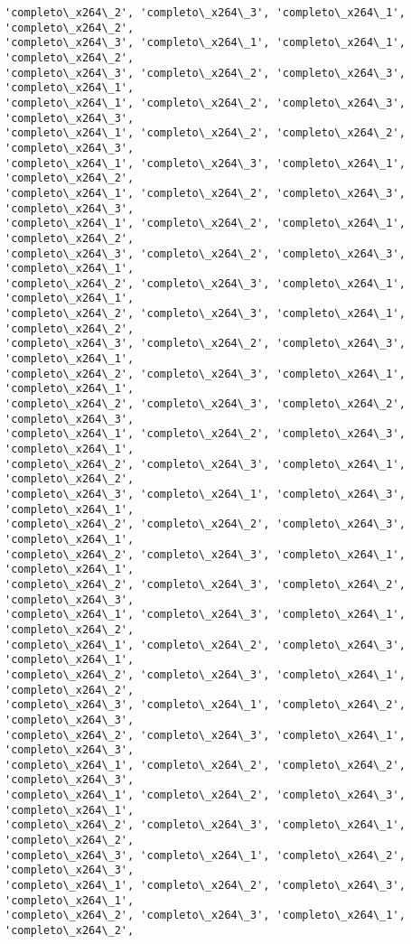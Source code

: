 \documentclass[11pt]{article}
\begin{document}
\begin{Verbatim}[commandchars=\\\{\}]
'completo\_x264\_2', 'completo\_x264\_3', 'completo\_x264\_1', 'completo\_x264\_2',
'completo\_x264\_3', 'completo\_x264\_1', 'completo\_x264\_1', 'completo\_x264\_2',
'completo\_x264\_3', 'completo\_x264\_2', 'completo\_x264\_3', 'completo\_x264\_1',
'completo\_x264\_1', 'completo\_x264\_2', 'completo\_x264\_3', 'completo\_x264\_3',
'completo\_x264\_1', 'completo\_x264\_2', 'completo\_x264\_2', 'completo\_x264\_3',
'completo\_x264\_1', 'completo\_x264\_3', 'completo\_x264\_1', 'completo\_x264\_2',
'completo\_x264\_1', 'completo\_x264\_2', 'completo\_x264\_3', 'completo\_x264\_3',
'completo\_x264\_1', 'completo\_x264\_2', 'completo\_x264\_1', 'completo\_x264\_2',
'completo\_x264\_3', 'completo\_x264\_2', 'completo\_x264\_3', 'completo\_x264\_1',
'completo\_x264\_2', 'completo\_x264\_3', 'completo\_x264\_1', 'completo\_x264\_1',
'completo\_x264\_2', 'completo\_x264\_3', 'completo\_x264\_1', 'completo\_x264\_2',
'completo\_x264\_3', 'completo\_x264\_2', 'completo\_x264\_3', 'completo\_x264\_1',
'completo\_x264\_2', 'completo\_x264\_3', 'completo\_x264\_1', 'completo\_x264\_1',
'completo\_x264\_2', 'completo\_x264\_3', 'completo\_x264\_2', 'completo\_x264\_3',
'completo\_x264\_1', 'completo\_x264\_2', 'completo\_x264\_3', 'completo\_x264\_1',
'completo\_x264\_2', 'completo\_x264\_3', 'completo\_x264\_1', 'completo\_x264\_2',
'completo\_x264\_3', 'completo\_x264\_1', 'completo\_x264\_3', 'completo\_x264\_1',
'completo\_x264\_2', 'completo\_x264\_2', 'completo\_x264\_3', 'completo\_x264\_1',
'completo\_x264\_2', 'completo\_x264\_3', 'completo\_x264\_1', 'completo\_x264\_1',
'completo\_x264\_2', 'completo\_x264\_3', 'completo\_x264\_2', 'completo\_x264\_3',
'completo\_x264\_1', 'completo\_x264\_3', 'completo\_x264\_1', 'completo\_x264\_2',
'completo\_x264\_1', 'completo\_x264\_2', 'completo\_x264\_3', 'completo\_x264\_1',
'completo\_x264\_2', 'completo\_x264\_3', 'completo\_x264\_1', 'completo\_x264\_2',
'completo\_x264\_3', 'completo\_x264\_1', 'completo\_x264\_2', 'completo\_x264\_3',
'completo\_x264\_2', 'completo\_x264\_3', 'completo\_x264\_1', 'completo\_x264\_3',
'completo\_x264\_1', 'completo\_x264\_2', 'completo\_x264\_2', 'completo\_x264\_3',
'completo\_x264\_1', 'completo\_x264\_2', 'completo\_x264\_3', 'completo\_x264\_1',
'completo\_x264\_2', 'completo\_x264\_3', 'completo\_x264\_1', 'completo\_x264\_2',
'completo\_x264\_3', 'completo\_x264\_1', 'completo\_x264\_2', 'completo\_x264\_3',
'completo\_x264\_1', 'completo\_x264\_2', 'completo\_x264\_3', 'completo\_x264\_1',
'completo\_x264\_2', 'completo\_x264\_3', 'completo\_x264\_1', 'completo\_x264\_2',

\end{Verbatim}
\end{document}
